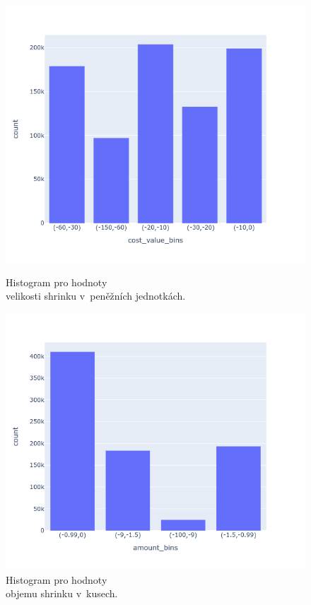 \begin{figure}[h!]
    \centering
    \begin{minipage}[b]{.55\textwidth}
      \centering
      \captionsetup{justification=centering}
      \includegraphics[width=\textwidth]{obrazky/grafy/histogram/newplot(2).png}
      \vspace*{-3em}
      \caption{Histogram pro hodnoty \\ velikosti shrinku v~peněžních jednotkách.}
      \label{obr:nb:hist}
    \end{minipage}%
    \hspace*{-2em}
    \begin{minipage}[b]{.55\textwidth}
        \centering
        \captionsetup{justification=centering}
        \includegraphics[width=\textwidth]{obrazky/grafy/histogram/newplot(1).png}
        \vspace*{-3em}
        \caption{Histogram pro hodnoty \\ objemu shrinku v~kusech.}
        \label{obr:nb:hist2}
    \end{minipage}
    \vspace*{-2em}
\end{figure}

